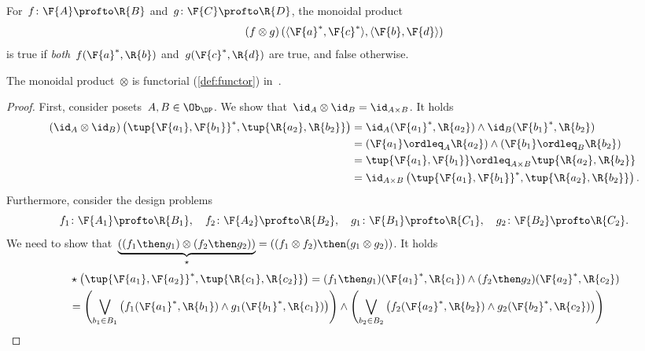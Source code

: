 \begin{remark}
  For~$f \colon \F{A} \profto \R{B}$ and~$g \colon \F{C} \profto \R{D}$, the monoidal product
  \begin{equation}
    \left(f \otimes g\right)(\langle \F{a}^*, \F{c}^*\rangle, \langle \F{b},\F{d} \rangle)
  \end{equation}
  is true if \emph{both}~$f(\F{a}^*,\R{b})$ and~$g(\F{c}^*,\R{d})$ are true, and false otherwise.
\end{remark}

\begin{lemma}
  \label{lem:monoidal_functorial}
  The monoidal product~$\otimes$ is functorial (\cref{def:functor}) in~\DP.
\end{lemma}
\begin{proof}
  First, consider posets~$A,B\in \Ob_\DP$. We show that~$\id_A\otimes \id_B = \id_{A\times B}$. It holds
  \begin{equation}
    \begin{aligned}
      \left( \id_{A}\otimes \id_{B}\right)
      \left( \tup{\F{a_1},\F{b_1}}^*,\tup{\R{a_2},\R{b_2}}\right)&=
      \id_A(\F{a_1}^*,\R{a_2})\wedge \id_B(\F{b_1}^*,\R{b_2})\\
      &=\left( \F{a_1}\ordleq_A \R{a_2}\right)\wedge \left( \F{b_1}\ordleq_B \R{b_2}\right)\\
      &=\tup{\F{a_1},\F{b_1}}\ordleq_{A\times B}\tup{\R{a_2},\R{b_2}}\\
      &=\id_{A\times B}\left( \tup{\F{a_1},\F{b_1}}^*,\tup{\R{a_2},\R{b_2}}\right).
    \end{aligned}
  \end{equation}
  Furthermore, consider the design problems
  \begin{equation*}
    f_1\colon \F{A_1} \profto \R{B_1},\quad f_2\colon \F{A_2}\profto \R{B_2}, \quad g_1\colon \F{B_1}\profto \R{C_1},\quad g_2\colon \F{B_2}\profto \R{C_2}.
  \end{equation*}
  We need to show that~$\underbrace{\left( (f_1\then g_1) \otimes (f_2\then g_2)\right)}_{\star}=\left( (f_1\otimes f_2)\then (g_1\otimes g_2)\right)$. It holds
  \begin{equation}
    \begin{aligned}
      &\star \left( \tup{\F{a_1},\F{a_2}}^*,\tup{\R{c_1},\R{c_2}}\right)=(f_1\then g_1)(\F{a_1}^*,\R{c_1})\wedge (f_2\then g_2)(\F{a_2}^*,\R{c_2})\\
      &=\left(\bigvee_{b_1\in B_1}\left( f_1(\F{a_1}^*,\R{b_1})\wedge g_1(\F{b_1}^*,\R{c_1})\right)\right) \wedge\left(\bigvee_{b_2\in B_2}\left( f_2(\F{a_2}^*,\R{b_2})\wedge g_2(\F{b_2}^*,\R{c_2})\right)\right)\\

\end{aligned}
\end{equation}
\end{proof}
